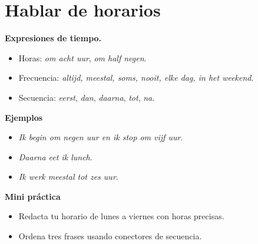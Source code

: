 \section{Hablar de horarios}
\textbf{Expresiones de tiempo.}
\begin{itemize}[leftmargin=*]
  \item Horas: \textit{om acht uur}, \textit{om half negen}.
  \item Frecuencia: \textit{altijd, meestal, soms, nooit, elke dag, in het weekend}.
  \item Secuencia: \textit{eerst}, \textit{dan}, \textit{daarna}, \textit{tot}, \textit{na}.
\end{itemize}

\textbf{Ejemplos}
\begin{itemize}[leftmargin=*]
  \item \textit{Ik begin om negen uur en ik stop om vijf uur}.
  \item \textit{Daarna eet ik lunch}.
  \item \textit{Ik werk meestal tot zes uur}.
\end{itemize}

\textbf{Mini práctica}
\begin{itemize}[leftmargin=*]
  \item Redacta tu horario de lunes a viernes con horas precisas.
  \item Ordena tres frases usando conectores de secuencia.
\end{itemize}
